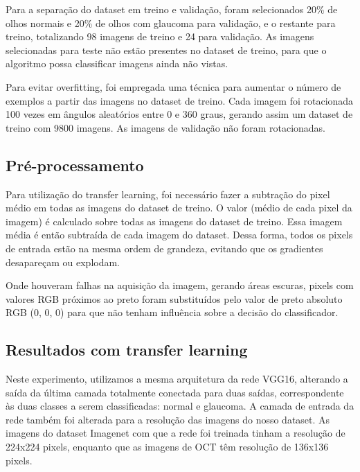 \documentclass[conference]{IEEEtran}
\begin{document}
  Para a separação do dataset em treino e validação, foram selecionados 20\% de olhos normais e 20\% de olhos com glaucoma para validação, e o restante para treino, totalizando 98 imagens de treino e 24 para validação. As imagens selecionadas para teste não estão presentes no dataset de treino, para que o algoritmo possa classificar imagens ainda não vistas.

  Para evitar overfitting, foi empregada uma técnica para aumentar o número de exemplos a partir das imagens no dataset de treino. Cada imagem foi rotacionada 100 vezes em ângulos aleatórios entre 0 e 360 graus, gerando assim um dataset de treino com 9800 imagens. As imagens de validação não foram rotacionadas.

  \subsection{Pré-processamento}


  
  
  Para utilização do transfer learning, foi necessário fazer a subtração do pixel médio em todas as imagens do dataset de treino. O valor (médio de cada pixel da imagem) é calculado sobre todas as imagens do dataset de treino. Essa imagem média é então subtraída de cada imagem do dataset. Dessa forma, todos os pixels de entrada estão na mesma ordem de grandeza, evitando que os gradientes desapareçam ou explodam.

  Onde houveram falhas na aquisição da imagem, gerando áreas escuras, pixels com valores RGB próximos ao preto foram substituídos pelo valor de preto absoluto RGB (0, 0, 0) para que não tenham influência sobre a decisão do classificador.

  \subsection{Resultados com transfer learning}



  Neste experimento, utilizamos a mesma arquitetura da rede VGG16, alterando a saída da última camada totalmente conectada para duas saídas, correspondente às duas classes a serem classificadas: normal e glaucoma. A camada de entrada da rede também foi alterada para a resolução das imagens do nosso dataset. As imagens do dataset Imagenet com que a rede foi treinada tinham a resolução de 224x224 pixels, enquanto que as imagens de OCT têm resolução de 136x136 pixels.
  
\end{document}
